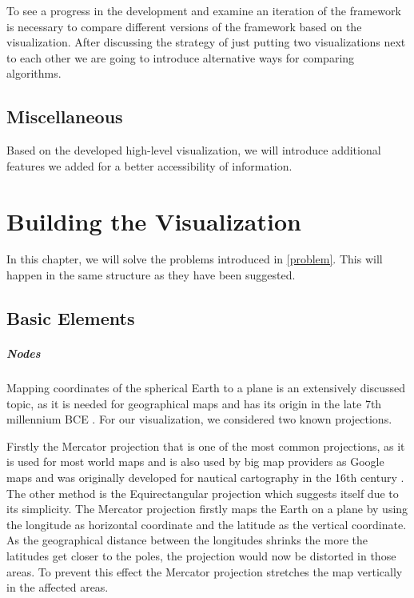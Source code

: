 \documentclass
[
    paper = a4,
    pagesize,
    12 pt,
    oneside,                       %
    open = right,
    DIV = calc,
    BCOR = 0 mm,                   %
    bibtotoc
]
{scrbook}
\begin{document}
To see a progress in the development and examine an iteration of the framework is necessary to compare different versions of the framework based on the visualization.
After discussing the strategy of just putting two visualizations next to each other we are going to introduce alternative ways for comparing algorithms.


\section{Miscellaneous}

Based on the developed high-level visualization, we will introduce additional features we added for a better accessibility of information.


\chapter{Building the Visualization} \label{main}

In this chapter, we will solve the problems introduced in \cref{problem}.
This will happen in the same structure as they have been suggested.


\section{Basic Elements} \label{graph}

\paragraph{Nodes}
Mapping coordinates of the spherical Earth to a plane is an extensively discussed topic, as it is needed for geographical maps and has its origin in the late 7th millennium BCE
.
For our visualization, we considered two known projections.

Firstly the Mercator projection that is one of the most common projections, as it is used for most world maps and is also used by big map providers as Google maps
 and was originally developed for nautical cartography in the 16th century
 .
The other method is the Equirectangular projection which suggests itself due to its simplicity.
The Mercator projection firstly maps the Earth on a plane by using the longitude as horizontal coordinate and the latitude as the vertical coordinate.
As the geographical distance between the longitudes shrinks the more the latitudes get closer to the poles, the projection would now be distorted in those areas.
To prevent this effect the Mercator projection stretches the map vertically in the affected areas.
\end{document}
